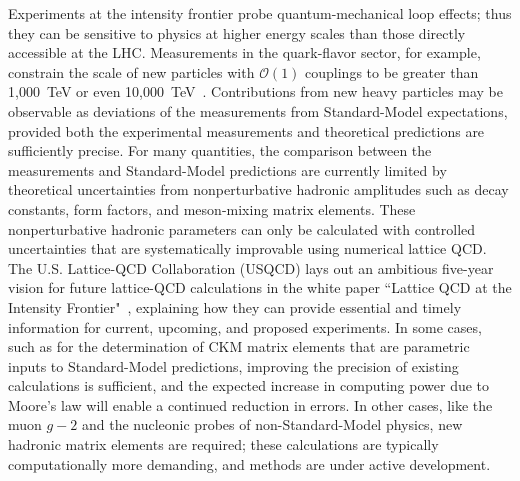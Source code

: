 Experiments at the intensity frontier probe
quantum-mechanical loop effects; thus they can be sensitive to physics at
higher energy scales than those directly accessible at the LHC.  Measurements in the quark-flavor sector, for example, constrain the scale of new particles with ${\mathcal O}(1)$ couplings to be greater than 1,000~TeV or even 10,000~TeV~\cite{Isidori:2010kg}.  
Contributions from new heavy particles may be
observable as deviations of the measurements from Standard-Model
expectations, provided both the experimental measurements and
theoretical predictions are sufficiently precise.  For many quantities, the comparison between the measurements and Standard-Model predictions are currently limited by theoretical uncertainties from nonperturbative hadronic amplitudes such as decay constants, form 
factors, and meson-mixing matrix elements.  These nonperturbative hadronic parameters can only be calculated with controlled uncertainties that are systematically improvable using numerical lattice QCD.  The U.S. Lattice-QCD Collaboration (USQCD) lays out an ambitious five-year vision for future lattice-QCD calculations in the white paper ``Lattice QCD at the Intensity Frontier"~\cite{USQCD_IF_whitepaper13}, explaining how they can provide essential and timely information for current, upcoming, and proposed experiments.  
In some cases, such as for the determination of CKM matrix elements that are parametric inputs to
Standard-Model predictions, improving the precision of existing calculations is sufficient, and the expected
increase in computing power due to Moore's law will enable a continued reduction in errors.
In other cases, like the muon $g-2$ and the nucleonic probes of non-Standard-Model physics, new hadronic matrix elements
are required; these calculations are typically computationally more demanding, and methods are
under active development.  

